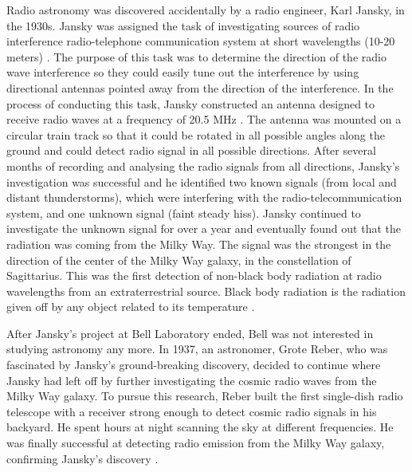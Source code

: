 Radio astronomy was discovered accidentally by a radio engineer, Karl Jansky, in the 1930s.
Jansky was assigned the task of investigating sources of radio interference radio-telephone communication system at short wavelengths (10-20 meters) \citep{verschuur2015invisible}.
The purpose of this task was to determine the direction of the radio wave interference so they could easily tune out the interference by using directional antennas pointed away from the direction of the interference. In the process of conducting this task, Jansky constructed an antenna designed to receive radio waves at a frequency of 20.5 MHz \citep{Jansky0}. The antenna was mounted on a circular train track so that it could be rotated in all possible angles along the ground and could detect radio signal in all possible directions. After several months of recording and analysing the radio signals from all directions, Jansky's investigation was successful and he identified two known signals (from local and  distant thunderstorms), which were interfering with the radio-telecommunication system, and one unknown signal (faint steady hiss). Jansky continued to investigate the unknown signal for over a year and eventually found out that the radiation was coming from the Milky Way. The signal was the strongest in the direction of the center of the Milky Way
galaxy, in the constellation of Sagittarius. This was the first detection of non-black body radiation at radio wavelengths from an extraterrestrial source. Black body radiation is the radiation given off by any object
related to its temperature \citep{Jansky1}.

After Jansky's project at Bell Laboratory ended, Bell was not interested in studying astronomy any more. In 1937, an astronomer, Grote Reber, who was fascinated by Jansky's ground-breaking discovery, decided to continue where Jansky had left off by further investigating the cosmic radio waves from the Milky Way galaxy. To pursue this research, Reber built the first single-dish radio telescope with a receiver strong enough to detect cosmic radio signals in his backyard. He spent hours at night scanning the sky at different frequencies. He was finally successful at detecting radio emission from the Milky Way galaxy, confirming Jansky's discovery \citep{verschuur2015invisible}.   

